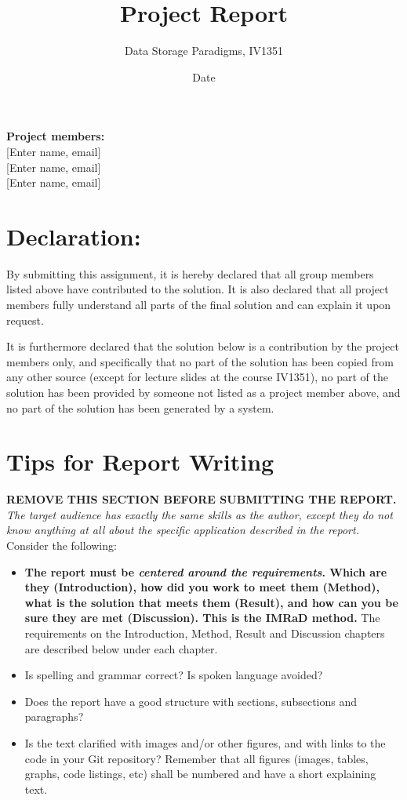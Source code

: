 \documentclass[a4paper]{scrartcl}
\title{Project Report}
\subtitle{Data Storage Paradigms, IV1351}
\author{}
\date{Date}
\begin{document}
\maketitle
\noindent\textbf{Project members:} \\ \hfill
[Enter name, email] \\ \hfill
[Enter name, email] \\ \hfill
[Enter name, email] \\ \hfill

\section*{Declaration:}

By submitting this assignment, it is hereby declared that all group members listed above have contributed to the solution. It is also declared that all project members fully understand all parts of the final solution and can explain it upon request.

It is furthermore declared that the solution below is a contribution by the project members only, and specifically that no part of the solution has been copied from any other source (except for lecture slides at the course IV1351), no part of the solution has been provided by someone not listed as a project member above, and no part of the solution has been generated by a system.

\section*{Tips for Report Writing}
\textbf{REMOVE THIS SECTION BEFORE SUBMITTING THE REPORT.}\\

\noindent \textit{The target audience has exactly the same skills as the author, except they do not know anything at all about the specific application described in the report.} \\

Consider the following:

\begin{itemize}
  \item \textbf{The report must be \textit{centered around the requirements}. Which are they (Introduction), how did you work to meet them (Method), what is the solution that meets them (Result), and how can you be sure they are met (Discussion). This is the IMRaD method.} The requirements on the Introduction, Method, Result and Discussion chapters are described below under each chapter.

  \item Is spelling and grammar correct? Is spoken language avoided?

  \item Does the report have a good structure with sections, subsections and paragraphs?

  \item Is the text clarified with images and/or other figures, and with links to the code in your Git repository? Remember that all figures (images, tables, graphs, code listings, etc) shall be numbered and have a short explaining text.
\end{itemize}
\end{document}
